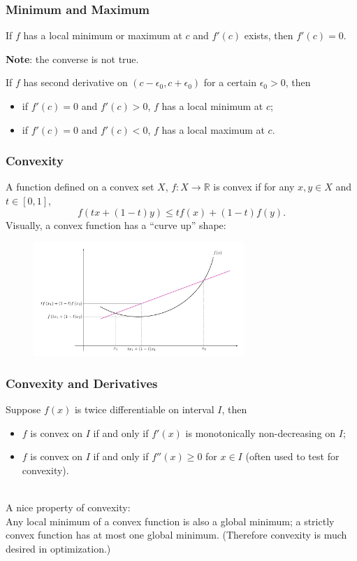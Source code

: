 \documentclass{beamer}
\begin{document}
\begin{frame}
\frametitle{Minimum and Maximum}
\begin{theorem}
If $f$ has a local minimum or maximum at $c$ and $f'(c)$ exists, then $f'(c)=0$.
\end{theorem}
\textbf{Note}: the converse is not true.
\vspace*{0.15in}
\begin{theorem}
If $f$ has second derivative on $(c-\epsilon_0,c+\epsilon_0)$ for a certain $\epsilon_0 > 0$, then
\begin{itemize}
\item if $f'(c)= 0 $ and $f'(c) > 0$, $f$ has a local minimum at $c$;
\item if $f'(c)= 0$ and $f'(c) < 0$, $f$ has a local maximum at $c$.
\end{itemize}
\end{theorem}
\end{frame}

\begin{frame}
\frametitle{Convexity}
A function defined on a convex set $X$, $f: X \rightarrow \mathbb{R}$ is convex if for any $x,y \in X$ and $t \in [0,1]$, 
$$
f(tx+(1-t)y) \leq tf(x) + (1-t)f(y).
$$
Visually, a convex function has a ``curve up'' shape:
\begin{figure}
\centering
\includegraphics[width=8cm]{Convex-Function.png}
\end{figure}

\end{frame}

\begin{frame}
\frametitle{Convexity and Derivatives}
Suppose $f(x)$ is twice differentiable on interval $I$, then
\begin{itemize}
\item $f$ is convex on $I$ if and only if $f'(x)$ is monotonically non-decreasing on $I$;
\item $f$ is convex on $I$ if and only if $f''(x) \geq 0$ for $x \in I$  (often used to test for convexity).
\end{itemize}
~\\
A nice property of convexity:\\
Any local minimum of a convex function is also a global minimum; a strictly convex function has at most one global minimum. (Therefore convexity is much desired in optimization.)

\end{frame}
\end{document}
